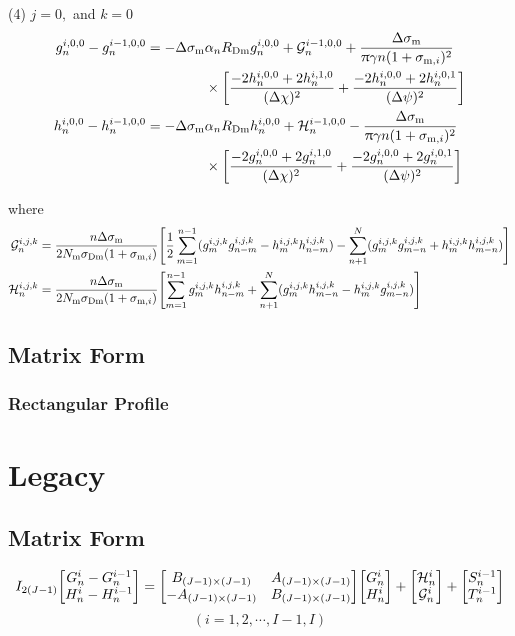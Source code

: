 \documentclass{article}
\begin{document}
(4) $j = 0,$ and $k =0$
\begin{align}
	g_n^{i,0,0}-g_n^{i-1,0,0} = - \Delta\sigma_\text{m}&\alpha_n R_\text{Dm} g_n^{i,0,0}
	+\mathcal{G}_n^{i-1,0,0}
	+\frac{\Delta\sigma_{\mathrm{m}}}{\uppi \gamma n(1+\sigma_{\mathrm{m},i})^2} \nonumber\\
	&\times\qty[\frac{-2h_n^{i,0,0}+2h_n^{i,1,0}}{(\Delta \chi)^2}
	+ \frac{-2h_n^{i,0,0} + 2h_n^{i,0,1} }{(\Delta \psi)^2}]\\
	h_n^{i,0,0}-h_n^{i-1,0,0} = - \Delta\sigma_\text{m}&\alpha_n R_\text{Dm} h_n^{i,0,0}
	+\mathcal{H}_n^{i-1,0,0}
	-\frac{\Delta\sigma_\text{m}}{\uppi \gamma n(1+\sigma_{\mathrm{m},i})^2} \nonumber\\
	&\times\qty[\frac{-2g_n^{i,0,0}+2g_n^{i,1,0}}{(\Delta \chi)^2}
	+ \frac{-2g_n^{i,0,0} + 2g_n^{i,0,1} }{(\Delta \psi)^2}]
\end{align}

where 
\begin{align}
	\mathcal{G}_n^{i,j,k} &= \frac{n\Delta \sigma_\text{m}}{2N_\text{m} \sigma_\text{Dm}
	(1+\sigma_{\mathrm{m},i})}
	\qty[\frac12 \sum_{m=1}^{n-1} (g_m^{i,j,k} g_{n-m}^{i,j,k}-
	h_{m}^{i,j,k} h_{n-m}^{i,j,k}) - 
	\sum_{n+1}^N (g_{m}^{i,j,k}g_{m-n}^{i,j,k} + h_{m}^{i,j,k} h_{m-n}^{i,j,k})]\\
	\mathcal{H}_n^{i,j,k} &= \frac{n\Delta \sigma_\text{m}}{2N_\text{m} \sigma_\text{Dm}
	(1+\sigma_{\mathrm{m},i})}
	\qty[\sum_{m=1}^{n-1} g_m^{i,j,k} h_{n-m}^{i,j,k}
	+\sum_{n+1}^N (g_{m}^{i,j,k}h_{m-n}^{i,j,k} - h_{m}^{i,j,k} g_{m-n}^{i,j,k})]
\end{align}

\subsection{Matrix Form}

\subsubsection{Rectangular Profile}



\section{Legacy}


\subsection{Matrix Form}
\begin{align}
	I_{2(J-1)} \mqty[G_n^i-G_n^{i-1}\\ H_n^i-H_n^{i-1}] 
= \mqty[B_{(J-1)\times(J-1)} & A_{(J-1)\times(J-1)}\\ -A_{(J-1)\times(J-1)} & B_{(J-1)\times(J-1)}] \mqty[G_n^i\\ H_n^i] 
+\mqty[\mathcal{H}_n^i\\ \mathcal{G}_n^i]
+\mqty[S_n^{i-1}\\ T_n^{i-1}]
\end{align}
$$
(i=1,2,\cdots, I-1,I)
$$
\end{document}
